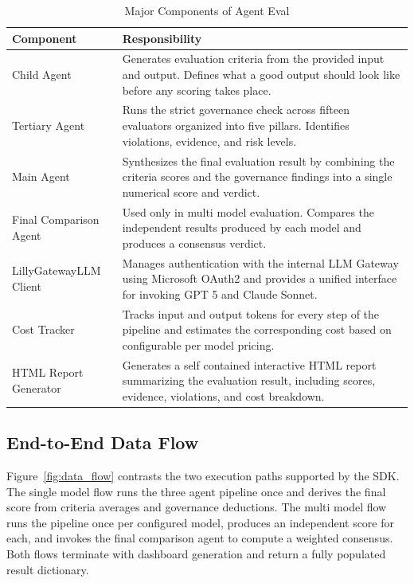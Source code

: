 \documentclass[12pt, a4paper, oneside]{report}
\begin{document}
\begin{table}[h]
\centering
\caption{Major Components of Agent Eval}
\label{tab:architecture-components}
\begin{tabular}{|p{6cm}|p{10cm}|}
\hline
\textbf{Component} & \textbf{Responsibility} \\
\hline

Child Agent &
Generates evaluation criteria from the provided input and output. Defines what a good output should look like before any scoring takes place.
\\
\hline

Tertiary Agent &
Runs the strict governance check across fifteen evaluators organized into five pillars. Identifies violations, evidence, and risk levels.
\\
\hline

Main Agent &
Synthesizes the final evaluation result by combining the criteria scores and the governance findings into a single numerical score and verdict.
\\
\hline

Final Comparison Agent &
Used only in multi model evaluation. Compares the independent results produced by each model and produces a consensus verdict.
\\
\hline

LillyGatewayLLM Client &
Manages authentication with the internal LLM Gateway using Microsoft OAuth2 and provides a unified interface for invoking GPT 5 and Claude Sonnet.
\\
\hline

Cost Tracker &
Tracks input and output tokens for every step of the pipeline and estimates the corresponding cost based on configurable per model pricing.
\\
\hline

HTML Report Generator &
Generates a self contained interactive HTML report summarizing the evaluation result, including scores, evidence, violations, and cost breakdown.
\\
\hline

\end{tabular}
\end{table}

\newpage

\subsection{End-to-End Data Flow}

Figure~\ref{fig:data_flow} contrasts the two execution paths supported by the SDK. The single model flow runs the three agent pipeline once and derives the final score from criteria averages and governance deductions. The multi model flow runs the pipeline once per configured model, produces an independent score for each, and invokes the final comparison agent to compute a weighted consensus. Both flows terminate with dashboard generation and return a fully populated result dictionary.
\end{document}
